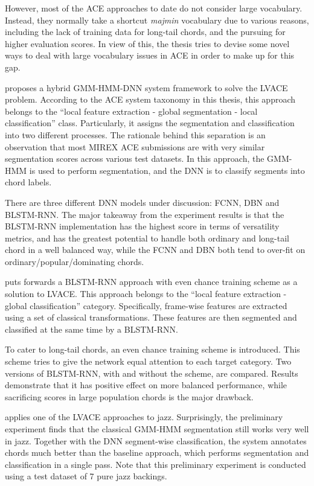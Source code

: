 However, most of the ACE approaches to date do not consider large vocabulary. Instead, they normally take a shortcut \textit{majmin} vocabulary due to various reasons, including the lack of training data for long-tail chords, and the pursuing for higher evaluation scores. In view of this, the thesis tries to devise some novel ways to deal with large vocabulary issues in ACE in order to make up for this gap.

 proposes a hybrid GMM-HMM-DNN system framework to solve the LVACE problem. According to the ACE system taxonomy in this thesis, this approach belongs to the ``local feature extraction - global segmentation - local classification'' class. Particularly, it assigns the segmentation and classification into two different processes. The rationale behind this separation is an observation that most MIREX ACE submissions are with very similar segmentation scores across various test datasets. In this approach, the GMM-HMM is used to perform segmentation, and the DNN is to classify segments into chord labels.

There are three different DNN models under discussion: FCNN, DBN and BLSTM-RNN. The major takeaway from the experiment results is that the BLSTM-RNN implementation has the highest score in terms of versatility metrics, and has the greatest potential to handle both ordinary and long-tail chord in a well balanced way, while the FCNN and DBN both tend to over-fit on ordinary/popular/dominating chords.

 puts forwards a BLSTM-RNN approach with even chance training scheme as a solution to LVACE. This approach belongs to the ``local feature extraction - global classification'' category. Specifically, frame-wise features are extracted using a set of classical transformations. These features are then segmented and classified at the same time by a BLSTM-RNN.

To cater to long-tail chords, an even chance training scheme is introduced. This scheme tries to give the network equal attention to each target category. Two versions of BLSTM-RNN, with and without the scheme, are compared. Results demonstrate that it has positive effect on more balanced performance, while sacrificing scores in large population chords is the major drawback.

 applies one of the LVACE approaches to jazz. Surprisingly, the preliminary experiment finds that the classical GMM-HMM segmentation still works very well in jazz. Together with the DNN segment-wise classification, the system annotates chords much better than the baseline approach, which performs segmentation and classification in a single pass. Note that this preliminary experiment is conducted using a test dataset of 7 pure jazz backings.

